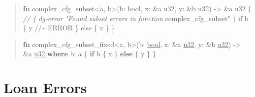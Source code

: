 \documentclass[
  11pt,
  twoside]{report}
\newenvironment{Shaded}{}{}
\newcommand{\CommentTok}[1]{\textit{#1}}
\newcommand{\ControlFlowTok}[1]{\textbf{#1}}
\newcommand{\DataTypeTok}[1]{\underline{#1}}
\newcommand{\KeywordTok}[1]{\textbf{#1}}
\newcommand{\NormalTok}[1]{#1}
\newcommand{\OperatorTok}[1]{#1}
\newcommand{\OtherTok}[1]{#1}
\newcommand{\StringTok}[1]{#1}
\begin{document}
\begin{quote}
\begin{Shaded}
\begin{Highlighting}[]
\KeywordTok{fn}\NormalTok{ complex\_cfg\_subset}\OperatorTok{\textless{}}\OtherTok{\textquotesingle{}a}\OperatorTok{,} \OtherTok{\textquotesingle{}b}\OperatorTok{\textgreater{}}\NormalTok{(b}\OperatorTok{:} \DataTypeTok{bool}\OperatorTok{,}\NormalTok{ x}\OperatorTok{:} \OperatorTok{\&}\OtherTok{\textquotesingle{}a} \DataTypeTok{u32}\OperatorTok{,}\NormalTok{ y}\OperatorTok{:} \OperatorTok{\&}\OtherTok{\textquotesingle{}b} \DataTypeTok{u32}\NormalTok{)}
    \OperatorTok{{-}\textgreater{}} \OperatorTok{\&}\OtherTok{\textquotesingle{}a} \DataTypeTok{u32} \OperatorTok{\{}
    \CommentTok{// \{ dg{-}error "Found subset errors in function}
\NormalTok{         complex\_cfg\_subset}\StringTok{" \} }
\StringTok{    if b \{}
\StringTok{        y //\textasciitilde{} ERROR}
\StringTok{    \} else \{}
\StringTok{        x}
\StringTok{    \}}
\StringTok{\}}
\end{Highlighting}
\end{Shaded}
\end{quote}

\begin{quote}
\begin{Shaded}
\begin{Highlighting}[]
\KeywordTok{fn}\NormalTok{ complex\_cfg\_subset\_fixed}\OperatorTok{\textless{}}\OtherTok{\textquotesingle{}a}\OperatorTok{,} \OtherTok{\textquotesingle{}b}\OperatorTok{\textgreater{}}\NormalTok{(b}\OperatorTok{:} \DataTypeTok{bool}\OperatorTok{,}\NormalTok{ x}\OperatorTok{:} \OperatorTok{\&}\OtherTok{\textquotesingle{}a} \DataTypeTok{u32}\OperatorTok{,}\NormalTok{ y}\OperatorTok{:} \OperatorTok{\&}\OtherTok{\textquotesingle{}b} \DataTypeTok{u32}\NormalTok{)}
    \OperatorTok{{-}\textgreater{}} \OperatorTok{\&}\OtherTok{\textquotesingle{}a} \DataTypeTok{u32} \KeywordTok{where} \OtherTok{\textquotesingle{}b}\OperatorTok{:} \OtherTok{\textquotesingle{}a} \OperatorTok{\{}
    \ControlFlowTok{if}\NormalTok{ b }\OperatorTok{\{}
\NormalTok{        x}
    \OperatorTok{\}} \ControlFlowTok{else} \OperatorTok{\{}
\NormalTok{        y}
    \OperatorTok{\}}
\OperatorTok{\}}
\end{Highlighting}
\end{Shaded}
\end{quote}

\clearpage

\section{Loan Errors}\label{sec:loan-errors}
\end{document}
